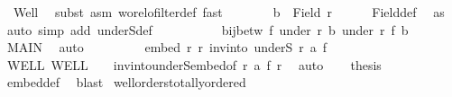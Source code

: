 \begin{isabellebody}
\ {}\ Well\ \isamarkupfalse%
\ {\isacharparenleft}{\kern0pt}subst\ {\isacharparenleft}{\kern0pt}asm{\isacharparenright}{\kern0pt}\ wo{\isacharunderscore}{\kern0pt}rel{\isachardot}{\kern0pt}ofilter{\isacharunderscore}{\kern0pt}def{\isacharparenright}{\kern0pt}\ fast{\isacharplus}{\kern0pt}\isanewline
\ \ \ \ \isamarkupfalse%
\ \isamarkupfalse%
\ {\isachardoublequoteopen}b\ {\isasymin}\ Field\ r{\isachardoublequoteclose}\isanewline
\ \ \ \ \isamarkupfalse%
\ Field{\isacharunderscore}{\kern0pt}def\ \isamarkupfalse%
\ as\ \isamarkupfalse%
\ {\isacharparenleft}{\kern0pt}auto\ simp\ add{\isacharcolon}{\kern0pt}\ underS{\isacharunderscore}{\kern0pt}def{\isacharparenright}{\kern0pt}\isanewline
\ \ \ \ \isamarkupfalse%
\isanewline
\ \ \ \ \isamarkupfalse%
\ {\isachardoublequoteopen}bij{\isacharunderscore}{\kern0pt}betw\ f\ {\isacharparenleft}{\kern0pt}under\ r\ b{\isacharparenright}{\kern0pt}\ {\isacharparenleft}{\kern0pt}under\ r{\isacharprime}{\kern0pt}\ {\isacharparenleft}{\kern0pt}f\ b{\isacharparenright}{\kern0pt}{\isacharparenright}{\kern0pt}{\isachardoublequoteclose}\isanewline
\ \ \ \ \isamarkupfalse%
\ MAIN{}\ \isamarkupfalse%
\ auto\isanewline
\ \ \isamarkupfalse%
\isanewline
\ \ \isanewline
\ \ \isamarkupfalse%
\ {\isachardoublequoteopen}embed\ r{\isacharprime}{\kern0pt}\ r\ {\isacharparenleft}{\kern0pt}inv{\isacharunderscore}{\kern0pt}into\ {\isacharparenleft}{\kern0pt}underS\ r\ {\isacharquery}{\kern0pt}a{\isacharparenright}{\kern0pt}\ f{\isacharparenright}{\kern0pt}{\isachardoublequoteclose}\isanewline
\ \ \isamarkupfalse%
\ WELL\ WELL{\isacharprime}{\kern0pt}\ {}\ {}\ {}\ inv{\isacharunderscore}{\kern0pt}into{\isacharunderscore}{\kern0pt}underS{\isacharunderscore}{\kern0pt}embed{\isacharbrackleft}{\kern0pt}of\ r\ {\isacharquery}{\kern0pt}a\ f\ r{\isacharprime}{\kern0pt}{\isacharbrackright}{\kern0pt}\ \isamarkupfalse%
\ auto\isanewline
\ \ \isamarkupfalse%
\ {\isacharquery}{\kern0pt}thesis\isanewline
\ \ \isamarkupfalse%
\ embed{\isacharunderscore}{\kern0pt}def\ \isamarkupfalse%
\ blast\isanewline
{}\isamarkupfalse%
%
\endisatagproof
{\isafoldproof}%
%
\isadelimproof
\isanewline
%
\endisadelimproof
\isanewline
{}\isamarkupfalse%
\ wellorders{\isacharunderscore}{\kern0pt}totally{\isacharunderscore}{\kern0pt}ordered{\isacharcolon}{\kern0pt}\isanewline

\end{isabellebody}
